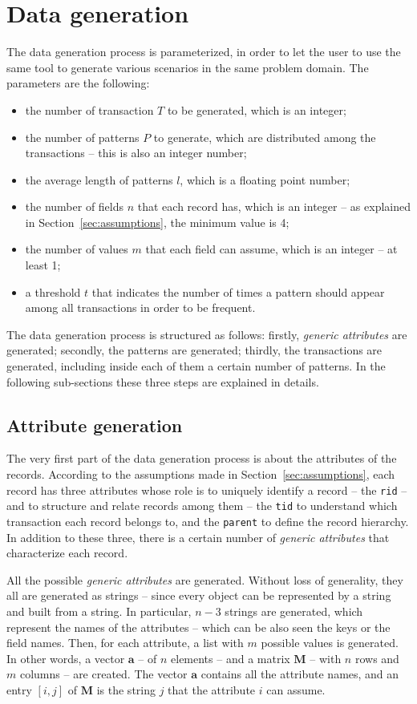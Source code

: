 \documentclass{acm_proc_article-sp-sigmod09}
\begin{document}
\section{Data generation}
\label{sec:generation}
The data generation process is parameterized, in order to let the user to use the same tool to generate various scenarios in the same problem domain. The parameters are the following:
\begin{itemize}
\item the number of transaction $T$ to be generated, which is an integer;
\item the number of patterns $P$ to generate, which are distributed among the transactions -- this is also an integer number;
\item the average length of patterns $l$, which is a floating point number;
\item the number of fields $n$ that each record has, which is an integer -- as explained in Section~\ref{sec:assumptions}, the minimum value is 4;
\item the number of values $m$ that each field can assume, which is an integer -- at least 1;
\item a threshold $t$ that indicates the number of times a pattern should appear among all transactions in order to be frequent.
\end{itemize} 
The data generation process is structured as follows: firstly, \emph{generic attributes} are generated; secondly, the patterns are generated; thirdly, the transactions are generated, including inside each of them a certain number of patterns. In the following sub-sections these three steps are explained in details.

\subsection{Attribute generation}
The very first part of the data generation process is about the attributes of the records. According to the assumptions made in Section~\ref{sec:assumptions}, each record has three attributes whose role is to uniquely identify a record -- the \texttt{rid} -- and to structure and relate records among them -- the \texttt{tid} to understand which transaction each record belongs to, and the \texttt{parent} to define the record hierarchy. In addition to these three, there is a certain number of \emph{generic attributes} that characterize each record.

All the possible \emph{generic attributes} are generated. Without loss of generality, they all are generated as strings -- since every object can be represented by a string and built from a string. In particular, $n - 3$ strings are generated, which represent the names of the attributes -- which can be also seen the keys or the field names. Then, for each attribute, a list with $m$ possible values is generated. In other words, a vector $\boldsymbol{a}$ -- of $n$ elements -- and a matrix $\boldsymbol{M}$ -- with $n$ rows and $m$ columns -- are created. The vector $\boldsymbol{a}$ contains all the attribute names, and an entry $[i, j]$ of $\boldsymbol{M}$ is the string $j$ that the attribute $i$ can assume.
\end{document}
